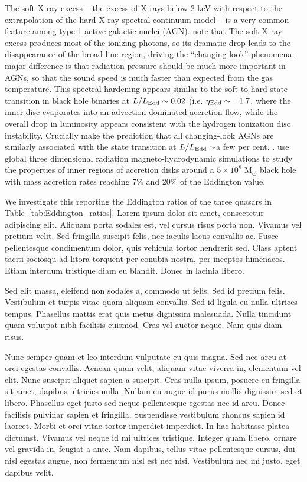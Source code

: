 \documentclass[a4paper,fleqn,usenatbib]{mnras}
\begin{document}
The soft X-ray excess -- the excess of X-rays below 2 keV with respect
to the extrapolation of the hard X-ray spectral continuum model -- is
a very common feature among type 1 active galactic nuclei (AGN). 
\citet{NodaDone2018} note that
The soft X-ray excess produces most of the ionizing photons, so its
dramatic drop leads to the disappearance of the broad-line region,
driving the ``changing-look'' phenomena.  major difference is that
radiation pressure should be much more important in AGNs, so that the
sound speed is much faster than expected from the gas temperature.
This spectral hardening appears similar to the soft-to-hard state
transition in black hole binaries at $L / L_{\rm Edd} \sim 0.02$
(i.e. $\eta_{\rm Edd} \sim -1.7$, where the inner disc evaporates into
an advection dominated accretion flow, while the overall drop in
luminosity appears consistent with the hydrogen ionization disc
instability.  Crucially \citet{NodaDone2018} make the prediction that
all changing-look AGNs are similarly associated with the state
transition at $L / L_{\rm Edd} \sim$a few per cent.
\citet{JiangYF2014, JiangYF2016, JiangYF2019}.
\citet{JiangYF2019arXiv} use global three dimensional radiation
magneto-hydrodynamic simulations to study the properties of inner
regions of accretion disks around a $5 \times 10^{8}$ M$_{\odot}$
black hole with mass accretion rates reaching 7\% and 20\% of the
Eddington value.

We investigate this reporting the Eddington ratios of the three
quasars in Table~\ref{tab:Eddington_ratios}.
Lorem ipsum dolor sit amet, consectetur adipiscing elit. Aliquam porta
sodales est, vel cursus risus porta non. Vivamus vel pretium
velit. Sed fringilla suscipit felis, nec iaculis lacus convallis
ac. Fusce pellentesque condimentum dolor, quis vehicula tortor
hendrerit sed. Class aptent taciti sociosqu ad litora torquent per
conubia nostra, per inceptos himenaeos. Etiam interdum tristique diam
eu blandit. Donec in lacinia libero.

Sed elit massa, eleifend non sodales a, commodo ut felis. Sed id
pretium felis. Vestibulum et turpis vitae quam aliquam convallis. Sed
id ligula eu nulla ultrices tempus. Phasellus mattis erat quis metus
dignissim malesuada. Nulla tincidunt quam volutpat nibh facilisis
euismod. Cras vel auctor neque. Nam quis diam risus.

Nunc semper quam et leo interdum vulputate eu quis magna. Sed nec arcu
at orci egestas convallis. Aenean quam velit, aliquam vitae viverra
in, elementum vel elit. Nunc suscipit aliquet sapien a suscipit. Cras
nulla ipsum, posuere eu fringilla sit amet, dapibus ultricies
nulla. Nullam eu augue id purus mollis dignissim sed et
libero. Phasellus eget justo sed neque pellentesque egestas nec id
arcu. Donec facilisis pulvinar sapien et fringilla. Suspendisse
vestibulum rhoncus sapien id laoreet. Morbi et orci vitae tortor
imperdiet imperdiet. In hac habitasse platea dictumst. Vivamus vel
neque id mi ultrices tristique. Integer quam libero, ornare vel
gravida in, feugiat a ante. Nam dapibus, tellus vitae pellentesque
cursus, dui nisl egestas augue, non fermentum nisl est nec
nisi. Vestibulum nec mi justo, eget dapibus velit.
\end{document}
